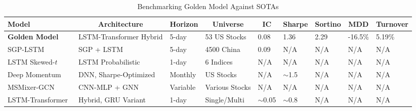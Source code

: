 \documentclass[twoside,final]{hcmut-report}
\begin{document}
\begin{table}[H]
  \centering
  \setlength{\tabcolsep}{4pt}
  \footnotesize
  \begin{tabular}{p{3.1cm} p{2.5cm} p{1cm} p{1.8cm} p{0.7cm} p{0.9cm} p{1.1cm} p{0.1cm} p{0.85cm}}
    \toprule
    \textbf{Model}                        & \multicolumn{1}{c}{\textbf{Architecture}} & \multicolumn{1}{c}{\textbf{Horizon}} & \multicolumn{1}{c}{\textbf{Universe}} & \multicolumn{1}{c}{\textbf{IC}} & \multicolumn{1}{c}{\textbf{Sharpe}} & \multicolumn{1}{c}{\textbf{Sortino}} & \multicolumn{1}{c}{\textbf{MDD}} & \multicolumn{1}{c}{\textbf{Turnover}} \\
    \midrule
    \textbf{Golden Model}                 & LSTM-Transformer Hybrid                   & 5-day                                & 53 US Stocks                          & 0.08                            & 1.36                                & 2.29                                 & -16.5\%                          & 5.19\%                                \\
    SGP-LSTM~\cite{sgp_lstm2024}          & SGP + LSTM                                & 5-day                                & 4500 China                            & 0.09                            & N/A                                 & N/A                                  & N/A                              & N/A                                   \\
    LSTM Skewed-$t$~\cite{lstm_skewt2025} & LSTM Probabilistic                        & 1-day                                & 6 Indices                             & N/A                             & N/A                                 & N/A                                  & N/A                              & N/A                                   \\
    Deep Momentum~\cite{deep_mom2019}     & DNN, Sharpe-Optimized                     & Monthly                              & US Stocks                             & N/A                             & $\sim$1.5                           & N/A                                  & N/A                              & N/A                                   \\
    MSMixer-GCN~\cite{msmixer_gcn2025}    & CNN-MLP + GNN                             & Variable                             & Various Stocks                        & N/A                             & N/A                                 & N/A                                  & N/A                              & N/A                                   \\
    LSTM-Transformer~\cite{lstmtrf2024}   & Hybrid, GRU Variant                       & 1-day                                & Single/Multi                          & $\sim$0.05                      & $\sim$0.8                           & N/A                                  & N/A                              & N/A                                   \\
    \bottomrule
  \end{tabular}
  \caption{Benchmarking Golden Model Against SOTAs}
  \label{tab:sota_benchmark}
\end{table}
\end{document}
